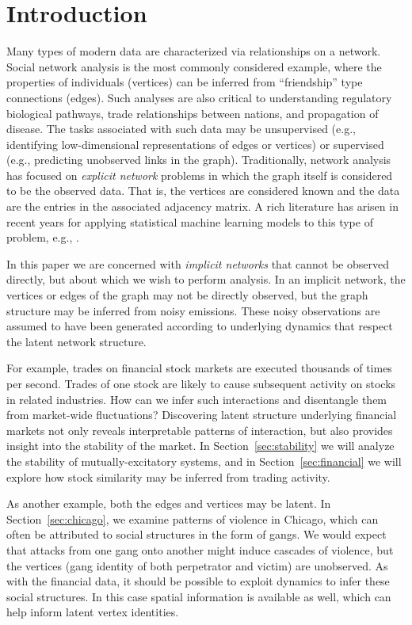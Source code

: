 \section{Introduction}
Many types of modern data are characterized via relationships on a network.  Social network analysis is the most commonly considered example, where the properties of individuals (vertices) can be inferred from ``friendship'' type connections (edges).  Such analyses are also critical to understanding regulatory biological pathways, trade relationships between nations, and propagation of disease.  The tasks associated with such data may be unsupervised (e.g., identifying low-dimensional representations of edges or vertices) or supervised (e.g., predicting unobserved links in the graph).  Traditionally, network analysis has focused on \emph{explicit network} problems in which the graph itself is considered to be the observed data.  That is, the vertices are considered known and the data are the entries in the associated adjacency matrix. A rich literature has arisen in recent years for applying statistical machine learning models to this type of problem, e.g., \citet{Liben-2007,Hoff-2008,Goldenberg-2010}.

In this paper we are concerned with \emph{implicit networks} that cannot be observed directly, but about which we wish to perform analysis.  In an implicit network, the vertices or edges of the graph may not be directly observed, but the graph structure may be inferred from noisy emissions.  These noisy observations are assumed to have been generated according to underlying dynamics that respect the latent network structure.

For example, trades on financial stock markets are executed thousands of times per second. Trades of one stock are likely to cause subsequent activity on stocks in related industries. How can we infer such interactions and disentangle them from market-wide fluctuations? Discovering latent structure underlying financial markets not only reveals interpretable patterns of interaction, but also provides insight into the stability of the market. In Section~\ref{sec:stability} we will analyze the stability of mutually-excitatory systems, and in Section~\ref{sec:financial} we will explore how stock similarity may be inferred from trading activity.

As another example, both the edges and vertices may be latent.  In Section~\ref{sec:chicago}, we examine patterns of violence in Chicago, which can often be attributed to social structures in the form of gangs.  We would expect that attacks from one gang onto another might induce cascades of violence, but the vertices (gang identity of both perpetrator and victim) are unobserved.  As with the financial data, it should be possible to exploit dynamics to infer these social structures.  In this case spatial information is available as well, which can help inform latent vertex identities.

